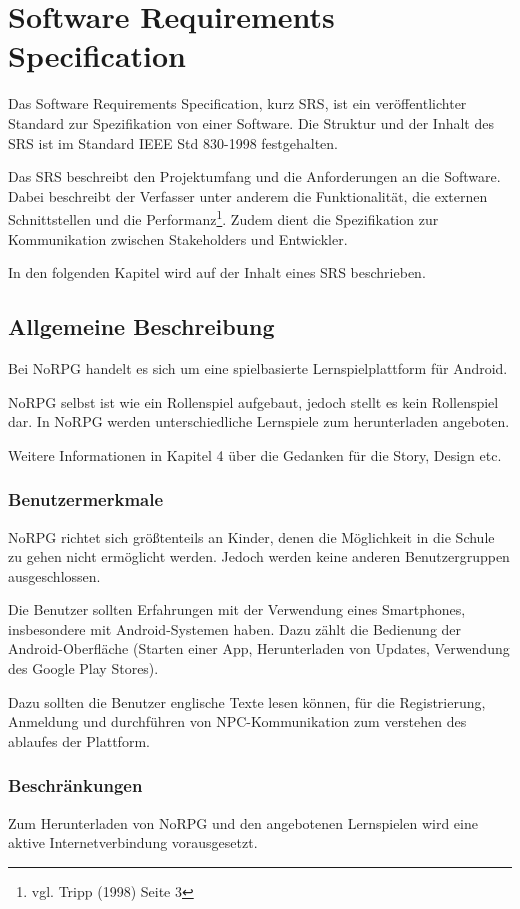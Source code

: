 \chapter{Software Requirements Specification}
	Das Software Requirements Specification, kurz SRS, ist ein veröffentlichter Standard zur Spezifikation von einer Software. Die Struktur und der Inhalt des SRS ist im Standard IEEE Std 830-1998 festgehalten.
	
	Das SRS beschreibt den Projektumfang und die Anforderungen an die Software. Dabei beschreibt der Verfasser unter anderem die Funktionalität, die externen Schnittstellen und die Performanz\footnote{vgl. Tripp \cite{srsIEEE}(1998) Seite 3}. Zudem dient die Spezifikation zur Kommunikation zwischen Stakeholders und Entwickler. 
	
	In den folgenden Kapitel wird auf der Inhalt eines SRS beschrieben.
	
\section{Allgemeine Beschreibung}
	Bei NoRPG handelt es sich um eine spielbasierte Lernspielplattform für Android. 


	NoRPG selbst ist wie ein Rollenspiel aufgebaut, jedoch stellt es kein Rollenspiel dar. In NoRPG werden unterschiedliche Lernspiele zum herunterladen angeboten.
	
	
	Weitere Informationen in Kapitel 4 über die Gedanken für die Story, Design etc.
	
	\subsection{Benutzermerkmale}
		NoRPG richtet sich größtenteils an Kinder, denen die Möglichkeit in die Schule zu gehen nicht ermöglicht werden. Jedoch werden keine anderen Benutzergruppen ausgeschlossen.
		
		Die Benutzer sollten Erfahrungen mit der Verwendung eines Smartphones, insbesondere mit Android-Systemen haben. Dazu zählt die Bedienung der Android-Oberfläche (Starten einer App, Herunterladen von Updates, Verwendung des Google Play Stores). 
		
		Dazu sollten die Benutzer englische Texte lesen können, für die Registrierung, Anmeldung und durchführen von NPC-Kommunikation zum verstehen des ablaufes der Plattform.
	
	\subsection{Beschränkungen} 
		Zum Herunterladen von NoRPG und den angebotenen Lernspielen wird eine aktive Internetverbindung vorausgesetzt.
		
